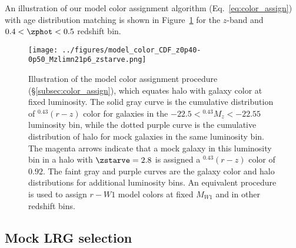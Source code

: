 \documentclass[twocolumn,apj,iop,tighten]{emulateapj2}
\begin{document}
An illustration of our model color assignment algorithm (Eq.~\ref{eq:color_assign}) with age distribution matching is shown in Figure~\ref{fig:color_assign} for the $z$-band and ${0.4<\zphot<0.5}$ redshift bin.

\begin{figure}
\centering
\texttt{[image: ../figures/model\_color\_CDF\_z0p40-0p50\_Mzlimn21p6\_zstarve.png]}
\caption{Illustration of the model color assignment procedure (\S\ref{subsec:color_assign}), which equates halo \zstarve with galaxy color at fixed luminosity. The solid gray curve is the cumulative distribution of $^{0.43}(r-z)$ color for galaxies in the $-22.5 < {^{0.43}M_z} < -22.55$ luminosity bin, while the dotted purple curve is the cumulative distribution of halo \zstarve for mock galaxies in the same luminosity bin. The magenta arrows indicate that a mock galaxy in this luminosity bin in a halo with $\zstarve=2.8$ is assigned a $^{0.43}(r-z)$ color of $0.92$. The faint gray and purple curves are the galaxy color and halo \zstarve distributions for additional luminosity bins. An equivalent procedure is used to assign $r-W1$ model colors at fixed $M_{W1}$ and in other redshift bins.
}
\label{fig:color_assign}
\end{figure}


\subsection{Mock LRG selection}\label{subsec:mock_lrg}
\end{document}
